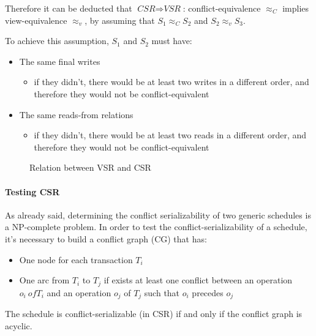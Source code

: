 \documentclass[english]{article}
\begin{document}
\bigskip
Therefore it can be deducted that \(\textit{CSR} \Rightarrow \textit{VSR}\): conflict-equivalence \(\approx_C\) implies view-equivalence \(\approx_v\), by assuming that \(S_1 \approx_C S_2\) and \(S_2 \approx_v S_3\).

To achieve this assumption, \(S_1\) and \(S_2\) must have:

\begin{itemize}
  \item The same final writes
        \begin{itemize}
          \item if they didn't, there would be at least two writes in a different order, and therefore they would not be conflict-equivalent
        \end{itemize}
  \item The same reads-from relations
        \begin{itemize}
          \item if they didn't, there would be at least two reads in a different order, and therefore they would not be conflict-equivalent
        \end{itemize}
\end{itemize}

\begin{figure}
  \bigskip
  \centering
  \caption{Relation between VSR and CSR}
  \label{fig:relation-between-vsr-and-csr}
  \bigskip
\end{figure}

\paragraph{Testing CSR}

As already said, determining the conflict serializability of two generic schedules is a NP-complete problem.
In order to test the conflict-serializability of a schedule, it's necessary to build a conflict graph (CG) that has:

\begin{itemize}
  \item One node for each transaction \(T_i\)
  \item One arc from \(T_i\) to \(T_j\) if exists at least one conflict between an operation \(o_i\ of T_i\) and an operation \(o_j\) of \(T_j\) such that \(o_i\) precedes \(o_j\)
\end{itemize}

The schedule is conflict-serializable (in CSR) if and only if the conflict graph is acyclic.
\end{document}
